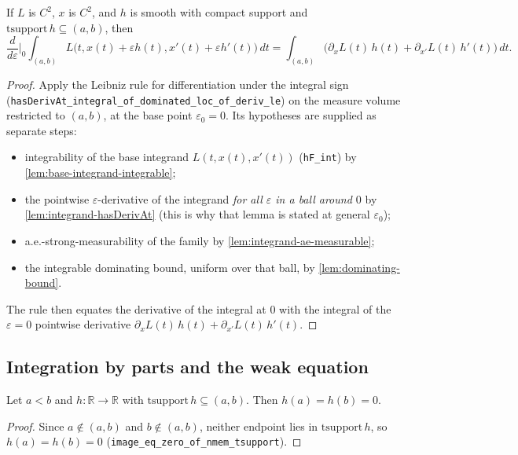 \begin{lemma}
    \label{lem:first-variation}
    \leanok
    If $L$ is $C^2$, $x$ is $C^2$, and $h$ is smooth with compact support and
    $\mathrm{tsupport}\, h \subseteq (a,b)$, then
    \[
      \frac{d}{d\varepsilon}\Bigg|_{0}
        \int_{(a,b)} L\bigl(t, x(t) + \varepsilon h(t), x'(t) + \varepsilon h'(t)\bigr)\, dt
      = \int_{(a,b)} \bigl(\partial_x L(t)\, h(t) + \partial_{x'} L(t)\, h'(t)\bigr)\, dt .
    \]
\end{lemma}
\begin{proof}
    Apply the Leibniz rule for differentiation under the integral sign
    (\texttt{hasDerivAt\_integral\_of\_dominated\_loc\_of\_deriv\_le}) on the
    measure $\mathrm{volume}$ restricted to $(a,b)$, at the base point
    $\varepsilon_0 = 0$. Its hypotheses are supplied as separate steps:
    \begin{itemize}
      \item integrability of the base integrand $L(t,x(t),x'(t))$
        (\texttt{hF\_int}) by \cref{lem:base-integrand-integrable};
      \item the pointwise $\varepsilon$-derivative of the integrand \emph{for all
        $\varepsilon$ in a ball around $0$} by \cref{lem:integrand-hasDerivAt}
        (this is why that lemma is stated at general $\varepsilon_0$);
      \item a.e.-strong-measurability of the family by
        \cref{lem:integrand-ae-measurable};
      \item the integrable dominating bound, uniform over that ball, by
        \cref{lem:dominating-bound}.
    \end{itemize}
    The rule then equates the derivative of the integral at $0$ with the integral
    of the $\varepsilon=0$ pointwise derivative
    $\partial_x L(t)\,h(t) + \partial_{x'} L(t)\,h'(t)$.
\end{proof}

\subsection{Integration by parts and the weak equation}

\begin{lemma}
    \label{lem:boundary-vanishing}
    \leanok
    Let $a < b$ and $h : \mathbb{R} \to \mathbb{R}$ with
    $\mathrm{tsupport}\,h \subseteq (a,b)$. Then $h(a) = h(b) = 0$.
\end{lemma}
\begin{proof}
    Since $a \notin (a,b)$ and $b \notin (a,b)$, neither endpoint lies in
    $\mathrm{tsupport}\,h$, so $h(a) = h(b) = 0$
    (\texttt{image\_eq\_zero\_of\_nmem\_tsupport}).
\end{proof}

